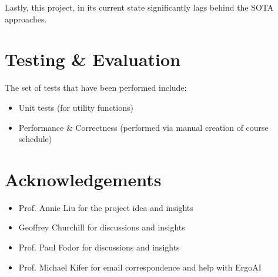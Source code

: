 \documentclass[12pt]{article}
\begin{document}
    Lastly, this project, in its current state significantly lags behind the SOTA approaches.
    
    \section{Testing \& Evaluation}
    \label{sec:test-eval}


    The set of tests that have been performed include: 

    \begin{itemize}
        \item Unit tests (for utility functions)
        \item Performance \& Correctness (performed via manual creation of course schedule)
    \end{itemize}
    
    \section{Acknowledgements}
    \label{sec:ack}

    \begin{itemize}
        \item Prof. Annie Liu for the project idea and insights
        \item Geoffrey Churchill for discussions and insights
        \item Prof. Paul Fodor for discussions and insights
        \item Prof. Michael Kifer for email correspondence and help with ErgoAI
    \end{itemize}


    \newpage
    
    
    
    

    \newpage
    
\end{document}
